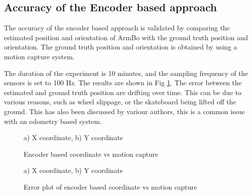 \documentclass[12pt, twoside]{report}
\begin{document}
\subsection{Accuracy of the Encoder based approach}
The accuracy of the encoder based approach is validated by comparing the
estimated position and orientation of ArmBo with the ground truth position and orientation.
The ground truth position and orientation is obtained by using a motion capture system.

The duration of the experiment is 10 minutes, and the sampling frequency of the sensors is  set to 100 Hz.
The results are shown in Fig \ref{fig:enc_val_coord}. The error between the estimated and ground truth position
are drifting over time. This can be due to various reasons, such as wheel slippage, or the skateboard
being lifted off the ground. This has also been discussed by variour authors, this is a common issue with
an odometry based system.


\begin{figure}[hbt!]
    \centering
    \caption{Encoder based coordinate vs motion capture}
    {a) X coordinate, b) Y coordinate}
    \label{fig:enc_val_coord}
\end{figure}


\begin{figure}[h!]
    \centering
    \caption{Error plot of encoder based coordinate vs motion capture}
    {a) X coordinate, b) Y coordinate}
    \label{fig:enc_val_coord_err}
\end{figure}
\end{document}
